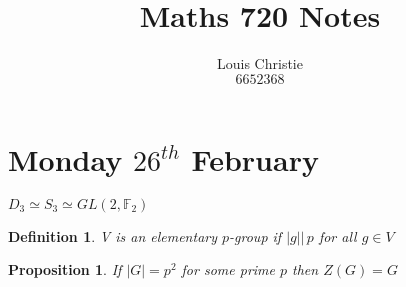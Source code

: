 \documentclass[a4paper,10pt]{article}
\newcommand{\FF}{\mathbb{F}}
\newtheorem{Def}[thm]{Definition}
\newtheorem{prop}[thm]{Proposition}
\begin{document}
\title{Maths 720 Notes}
\author{Louis Christie \\ $6652368$}
\maketitle


\onehalfspacing



\section{Monday $26^{th}$ February}
$D_3 \simeq S_3 \simeq GL(2, \FF_2)$
\begin{Def}
V is an elementary $p$-group if $|g| \big|\, p$ for all $g \in V$
\end{Def}
\begin{prop}
If $|G| = p^2$ for some prime $p$ then $Z(G) = G$
\end{prop}
\end{document}
